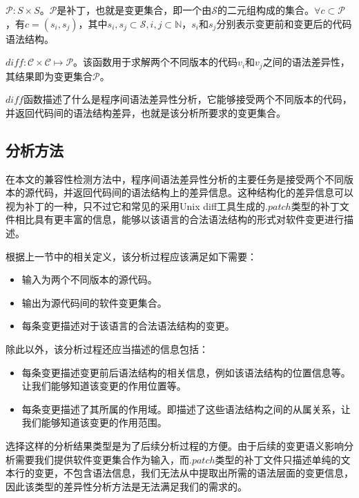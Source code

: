 \begin{definition}
	$\mathcal{P}: S \times S$。$\mathcal{P}$是补丁，也就是变更集合，即一个由$\mathcal{S}$的二元组构成的集合。$\forall c \subset \mathcal{P}$，有$c = (s_i,s_j)$，其中$s_i,s_j \subset \mathcal{S},i,j \subset \mathbb{N}$，$s_i$和$s_j$分别表示变更前和变更后的代码语法结构。
\end{definition}

\begin{definition}
	\label {define_diff}
	$diff : \mathcal{C} \times \mathcal{C} \mapsto \mathcal{P}$。该函数用于求解两个不同版本的代码$v_i$和$v_j$之间的语法差异性，其结果即为变更集合$\mathcal{P}$。
\end{definition}

$diff$函数描述了什么是程序间语法差异性分析，它能够接受两个不同版本的代码，并返回代码间的语法结构差异，也就是该分析所要求的变更集合。

\subsection{分析方法}

在本文的兼容性检测方法中，程序间语法差异性分析的主要任务是接受两个不同版本的源代码，并返回代码间的语法结构上的差异信息。这种结构化的差异信息可以视为补丁的一种，只不过它和常见的采用Unix diff工具生成的$.patch$类型的补丁文件相比具有更丰富的信息，能够以该语言的合法语法结构的形式对软件变更进行描述。

根据上一节中的相关定义，该分析过程应该满足如下需要：
\begin{itemize}
	\item 输入为两个不同版本的源代码。
	\item 输出为源代码间的软件变更集合。
	\item 每条变更描述对于该语言的合法语法结构的变更。
\end{itemize}

除此以外，该分析过程还应当描述的信息包括：
\begin{itemize}
	\item 每条变更描述变更前后语法结构的相关信息，例如该语法结构的位置信息等。让我们能够知道该变更的作用位置等。
	\item 每条变更描述了其所属的作用域。即描述了这些语法结构之间的从属关系，让我们能够知道该变更的作用范围。
\end{itemize}

选择这样的分析结果类型是为了后续分析过程的方便。由于后续的变更语义影响分析需要我们提供软件变更集合作为输入，而$.patch$类型的补丁文件只描述单纯的文本行的变更，不包含语法信息，我们无法从中提取出所需的语法层面的变更信息，因此该类型的差异性分析方法是无法满足我们的需求的。

